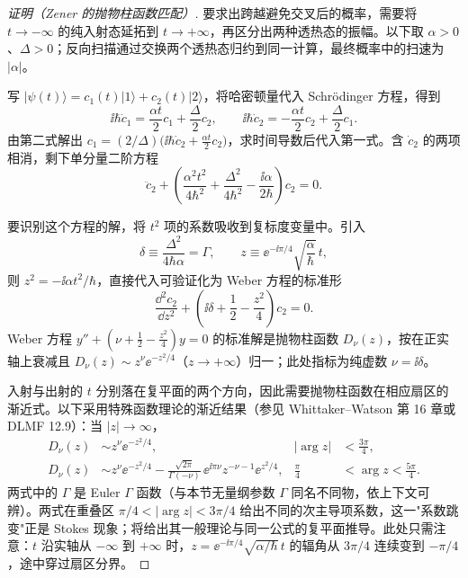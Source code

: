 \begin{proof}[证明（Zener 的抛物柱函数匹配）]
要求出跨越避免交叉后的概率，需要将 $t\to-\infty$ 的纯入射态延拓到 $t\to+\infty$，再区分出两种透热态的振幅。以下取 $\alpha>0$、$\Delta>0$；反向扫描通过交换两个透热态归约到同一计算，最终概率中的扫速为 $|\alpha|$。

写 $|\psi(t)\rangle=c_1(t)|1\rangle+c_2(t)|2\rangle$，将哈密顿量代入 Schr\"odinger 方程，得到
\begin{equation*}
\ii\hbar\dot c_1=\frac{\alpha t}{2}c_1+\frac{\Delta}{2}c_2,
\qquad
\ii\hbar\dot c_2=-\frac{\alpha t}{2}c_2+\frac{\Delta}{2}c_1.
\end{equation*}
由第二式解出 $c_1=(2/\Delta)\bigl(\ii\hbar\dot c_2+\tfrac{\alpha t}{2}c_2\bigr)$，求时间导数后代入第一式。含 $\dot c_2$ 的两项相消，剩下单分量二阶方程
\begin{equation}
\ddot c_2+\left(\frac{\alpha^2t^2}{4\hbar^2}
+\frac{\Delta^2}{4\hbar^2}-\frac{\ii\alpha}{2\hbar}\right)c_2=0.
\label{eq:tdpt-lz-second-order}
\end{equation}

要识别这个方程的解，将 $t^2$ 项的系数吸收到复标度变量中。引入
\[
\delta\equiv\frac{\Delta^2}{4\hbar\alpha}=\Gamma,
\qquad
z\equiv\ee^{-\ii\pi/4}\sqrt{\frac{\alpha}{\hbar}}\,t,
\]
则 $z^2=-\ii\alpha t^2/\hbar$，直接代入可验证化为 Weber 方程的标准形
\begin{equation}
\frac{\dd^2 c_2}{\dd z^2}+\left(\ii\delta+\frac12-\frac{z^2}{4}\right)c_2=0.
\label{eq:tdpt-lz-weber}
\end{equation}
Weber 方程 $y''+(\nu+\tfrac12-\tfrac{z^2}{4})y=0$ 的标准解是抛物柱函数 $D_\nu(z)$，按在正实轴上衰减且 $D_\nu(z)\sim z^{\nu}\ee^{-z^2/4}$（$z\to+\infty$）归一；此处指标为纯虚数 $\nu=\ii\delta$。

入射与出射的 $t$ 分别落在复平面的两个方向，因此需要抛物柱函数在相应扇区的渐近式。以下采用特殊函数理论的渐近结果（参见 Whittaker--Watson 第 16 章或 DLMF 12.9）：当 $|z|\to\infty$，
\begin{align}
D_\nu(z)&\sim z^{\nu}\ee^{-z^2/4},
&|\arg z|&<\frac{3\pi}{4},
\label{eq:tdpt-lz-dnu-sector1}\\
D_\nu(z)&\sim z^{\nu}\ee^{-z^2/4}
-\frac{\sqrt{2\pi}}{\Gamma(-\nu)}\,\ee^{\ii\pi\nu}z^{-\nu-1}\ee^{z^2/4},
&\frac{\pi}{4}&<\arg z<\frac{5\pi}{4}.
\label{eq:tdpt-lz-dnu-sector2}
\end{align}
两式中的 $\Gamma$ 是 Euler $\Gamma$ 函数（与本节无量纲参数 $\Gamma$ 同名不同物，依上下文可辨）。两式在重叠区 $\pi/4<|\arg z|<3\pi/4$ 给出不同的次主导项系数，这一"系数跳变"正是 Stokes 现象；将给出其一般理论与同一公式的复平面推导。此处只需注意：$t$ 沿实轴从 $-\infty$ 到 $+\infty$ 时，$z=\ee^{-\ii\pi/4}\sqrt{\alpha/\hbar}\,t$ 的辐角从 $3\pi/4$ 连续变到 $-\pi/4$，途中穿过扇区分界。


\end{proof}
